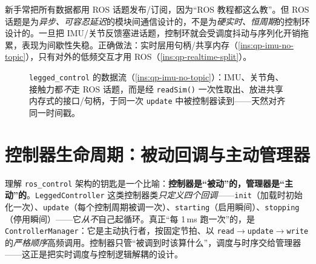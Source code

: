 \begin{pitfall}
新手常把所有数据都用 ROS 话题发布/订阅，因为“ROS 教程都这么教”。但 ROS 话题是为\emph{异步、可容忍延迟}的模块间通信设计的，不是为\emph{硬实时、恒周期}的控制环设计的。一旦把 IMU/关节反馈塞进话题，控制环就会受调度抖动与序列化开销拖累，表现为间歇性失稳。正确做法：实时层用句柄/共享内存（\cref{ins:qp-imu-no-topic}），只有对外的低频交互才用 ROS（\cref{ins:qp-realtime-split}）。
\end{pitfall}

\begin{figure}[ht]
\centering
{}
\caption{\texttt{legged\_control} 的数据流（\cref{ins:qp-imu-no-topic}）：IMU、关节角、接触力都\emph{不}走 ROS 话题，而是经 \texttt{readSim()} 一次性取出、放进共享内存式的接口/句柄，于同一次 \texttt{update} 中被控制器读到——天然对齐同一时间戳。}
\label{fig:qp-dataflow}
\end{figure}

\section{控制器生命周期：被动回调与主动管理器}
\label{sec:qp-lifecycle}

\begin{insight}\label{ins:qp-passive-active}
理解 \texttt{ros\_control} 架构的钥匙是一个比喻：\textbf{控制器是“被动”的，管理器是“主动”的}。\texttt{LeggedController} 这类控制器类\emph{只定义四个回调}——\texttt{init}（加载时初始化一次）、\texttt{update}（每个控制周期被调一次）、\texttt{starting}（启用瞬间）、\texttt{stopping}（停用瞬间）——它\emph{从不}自己起循环。真正“每 1\,ms 跑一次”的，是 \texttt{ControllerManager}：它是主动执行者，按固定节拍、以 \texttt{read}$\to$\texttt{update}$\to$\texttt{write} 的\emph{严格顺序}高频调用\cite{sleiman2021unified}。控制器只管“被调到时该算什么”，调度与时序交给管理器——这正是把实时调度与控制逻辑解耦的设计。
\end{insight}

